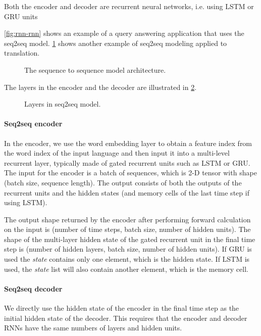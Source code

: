 Both the encoder and decoder are recurrent neural networks, i.e. using LSTM or GRU units


\cref{fig:rnn-rnn} shows an example of a query answering application that uses the seq2seq model. \cref{fig:seq2seq} shows another example of seq2seq modeling applied to translation.

\begin{figure}[hpt]
    \centering
    
    \caption{The sequence to sequence model architecture.}
    \label{fig:seq2seq}
\end{figure}

The layers in the encoder and the decoder are illustrated in \cref{fig:seq2seq_details}.

\begin{figure}[hpt]
    \centering
    
    \caption{Layers in seq2seq model.}
    \label{fig:seq2seq_details}
\end{figure}

\paragraph{Seq2seq encoder}
In the encoder, we use the word embedding layer to obtain a feature index from the word index of the input language and then input it into a multi-level recurrent layer, typically made of gated recurrent units such as LSTM or GRU. The input for the encoder is a batch of sequences, which is 2-D tensor with shape (batch size, sequence length). The output consists of both the outputs of the recurrent units and the hidden states (and memory cells of the last time step if using LSTM).

The output shape returned by the encoder after performing forward calculation on the input is (number of time steps, batch size, number of hidden units). The shape of the multi-layer hidden state of the gated recurrent unit in the final time step is (number of hidden layers, batch size, number of hidden units). If GRU is used the \textit{state}  contains only one element, which is the hidden state. If LSTM is used, the \textit{state} list will also contain another element, which is the memory cell.

\paragraph{Seq2seq decoder}
We directly use the hidden state of the encoder in the final time step as the initial hidden state of the decoder. This requires that the encoder and decoder RNNs have the same numbers of layers and hidden units.

